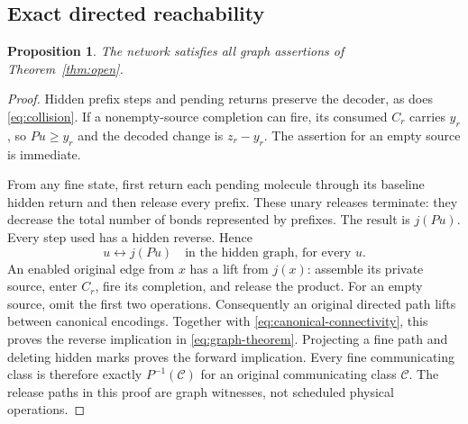 \documentclass[11pt,reqno]{amsart}
\newtheorem{proposition}[theorem]{Proposition}
\theoremstyle{definition}
\theoremstyle{remark}
\begin{document}
\subsection{Exact directed reachability}
\begin{proposition}\label{prop:graph}
The network satisfies all graph assertions of Theorem~\ref{thm:open}.
\end{proposition}
\begin{proof}
Hidden prefix steps and pending returns preserve the decoder, as does
\eqref{eq:collision}. If a nonempty-source completion can fire, its consumed
$C_r$ carries $y_r$, so $Pu\ge y_r$ and the decoded change is $z_r-y_r$.
The assertion for an empty source is immediate.

From any fine state, first return each pending molecule through its baseline
hidden return and then release every prefix. These unary releases terminate:
they decrease the total number of bonds represented by prefixes. The result
is $j(Pu)$. Every step used has a hidden reverse. Hence
\begin{equation}\label{eq:canonical-connectivity}
 u\longleftrightarrow j(Pu)
 \quad\text{in the hidden graph, for every }u.
\end{equation}
An enabled original edge from $x$ has a lift from $j(x)$: assemble its private
source, enter $C_r$, fire its completion, and release the product. For an empty
source, omit the first two operations. Consequently an original directed path
lifts between canonical encodings. Together with
\eqref{eq:canonical-connectivity}, this proves the reverse implication in
\eqref{eq:graph-theorem}. Projecting a fine path and deleting hidden marks
proves the forward implication. Every fine communicating class is therefore
exactly $P^{-1}(\mathcal C)$ for an original communicating class $\mathcal C$.
The release paths in this proof are graph witnesses, not scheduled physical
operations.
\end{proof}
\end{document}
